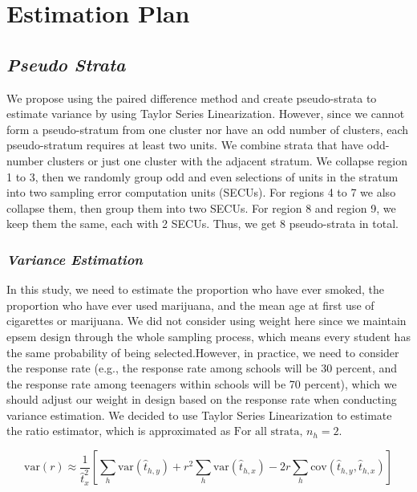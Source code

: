 \documentclass[
  12pt]{article}
\begin{document}
\section{Estimation Plan}\label{estimation-plan}

\subsection{\texorpdfstring{\emph{Pseudo
Strata}}{Pseudo Strata}}\label{pseudo-strata}

We propose using the paired difference method and create pseudo-strata
to estimate variance by using Taylor Series Linearization. However,
since we cannot form a pseudo-stratum from one cluster nor have an odd
number of clusters, each pseudo-stratum requires at least two units. We
combine strata that have odd-number clusters or just one cluster with
the adjacent stratum. We collapse region 1 to 3, then we randomly group
odd and even selections of units in the stratum into two sampling error
computation units (SECUs). For regions 4 to 7 we also collapse them,
then group them into two SECUs. For region 8 and region 9, we keep them
the same, each with 2 SECUs. Thus, we get 8 pseudo-strata in total.

\subsubsection{\texorpdfstring{\emph{Variance
Estimation}}{Variance Estimation}}\label{variance-estimation}

In this study, we need to estimate the proportion who have ever smoked,
the proportion who have ever used marijuana, and the mean age at first
use of cigarettes or marijuana. We did not consider using weight here
since we maintain epsem design through the whole sampling process, which
means every student has the same probability of being selected.However,
in practice, we need to consider the response rate (e.g., the response
rate among schools will be 30 percent, and the response rate among
teenagers within schools will be 70 percent), which we should adjust our
weight in design based on the response rate when conducting variance
estimation. We decided to use Taylor Series Linearization to estimate
the ratio estimator, which is approximated as
\(\text{For all strata, } n_h = 2\).

\[
\text{var}(r) \approx \frac{1}{\hat{t}_x^2} \left[ \sum_h \text{var}(\hat{t}_{h,y}) + r^2 \sum_h \text{var}(\hat{t}_{h,x}) - 2r \sum_h \text{cov}(\hat{t}_{h,y}, \hat{t}_{h,x}) \right]
\]
\end{document}
